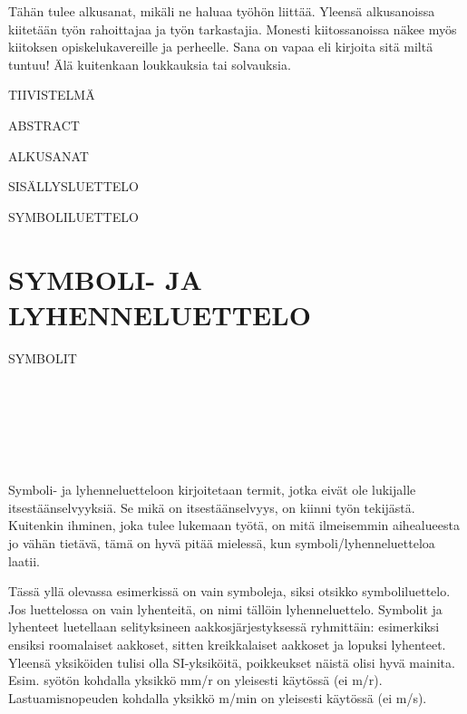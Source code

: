 \documentclass{LUT_pohja}[2016/03/09 LUT Dippa Pohja]
\begin{document}
\begin{preface}
Tähän tulee alkusanat, mikäli ne haluaa työhön liittää. Yleensä alkusanoissa kiitetään työn 
rahoittajaa  ja  työn tarkastajia.  Monesti kiitossanoissa  näkee  myös  kiitoksen 
opiskelukavereille ja perheelle. Sana on vapaa eli kirjoita sitä miltä tuntuu! Älä kuitenkaan 
loukkauksia tai solvauksia. 
\end{preface}


\renewcommand\contentsname{ } %

\pagestyle{Mainstyle}
\newpage
\begin{luettelo}
\MakeUppercase{Tiivistelmä}\par
\MakeUppercase{Abstract}\par
\MakeUppercase{Alkusanat}\par
\MakeUppercase{Sisällysluettelo}\par
\MakeUppercase{Symboliluettelo}\par
\end{luettelo}
\tableofcontents


\newpage
\section*{\MakeUppercase{Symboli- ja lyhenneluettelo}}
SYMBOLIT\par
\itab{$\alpha$} \\
 \\
 \\
 \\
 \\
 

Symboli-  ja  lyhenneluetteloon  kirjoitetaan  termit,  jotka  eivät  ole  lukijalle 
itsestäänselvyyksiä. Se mikä on itsestäänselvyys, on kiinni työn tekijästä. Kuitenkin 
ihminen, joka tulee lukemaan työtä, on mitä ilmeisemmin aihealueesta jo vähän tietävä, 
tämä on hyvä pitää mielessä, kun symboli/lyhenneluetteloa laatii.\par
Tässä yllä olevassa esimerkissä on vain symboleja, siksi otsikko symboliluettelo. Jos 
luettelossa on vain lyhenteitä, on nimi tällöin lyhenneluettelo. Symbolit  ja lyhenteet 
luetellaan selityksineen aakkosjärjestyksessä ryhmittäin: esimerkiksi ensiksi roomalaiset 
aakkoset, sitten kreikkalaiset aakkoset ja lopuksi lyhenteet. Yleensä yksiköiden tulisi olla 
SI-yksiköitä, poikkeukset näistä olisi hyvä mainita. Esim. syötön kohdalla yksikkö mm/r 
on yleisesti käytössä (ei m/r). Lastuamisnopeuden kohdalla yksikkö m/min on yleisesti 
käytössä (ei m/s).
\end{document}
